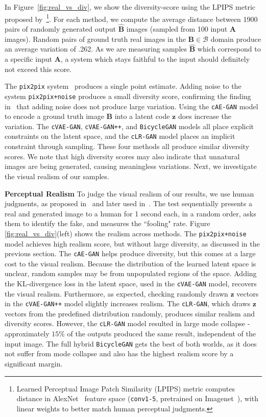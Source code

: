 In Figure~\ref{fig:real_vs_div}, we show the diversity-score using the LPIPS metric proposed by~\cite{zhang2018unreasonable}\footnote{Learned Perceptual Image Patch Similarity (LPIPS) metric computes distance in AlexNet~\cite{krizhevsky2014one} feature space (\texttt{conv1-5}, pretrained on Imagenet~\citep{russakovsky2015imagenet}), with linear weights to better match human perceptual judgments.}. For each method, we compute the average distance between 1900 pairs of randomly generated output $\widehat{\mathbf{B}}$ images (sampled from 100 input $\mathbf{A}$ images). Random pairs of ground truth real images in the $\mathbf{B} \in \mathcal{B}$ domain produce an average variation of .262. As we are measuring samples $\widehat{\mathbf{B}}$ which correspond to a specific input $\mathbf{A}$, a system which stays faithful to the input should definitely not exceed this score.

The \texttt{pix2pix} system~\citep{isola2016image} produces a single point estimate. Adding noise to the system \texttt{pix2pix+noise} produces a small diversity score, confirming the finding in~\citep{isola2016image} that adding noise does not produce large variation. Using the \texttt{cAE-GAN} model to encode a ground truth image $\mathbf{B}$ into a latent code $\mathbf{z}$ does increase the variation. The \texttt{cVAE-GAN}, \texttt{cVAE-GAN++}, and \texttt{BicycleGAN} models all place explicit constraints on the latent space, and the \texttt{cLR-GAN} model places an implicit constraint through sampling. These four methods all produce similar diversity scores. We note that high diversity scores may also indicate that unnatural images are being generated, causing meaningless variations. Next, we investigate the visual realism of our samples.

{\bf Perceptual Realism} To judge the visual realism of our results, we use human judgments, as proposed in~\citep{zhang2016colorful} and later used in~\citep{isola2016image,zhu2017unpaired}. The test sequentially presents a real and generated image to a human for 1 second each, in a random order, asks them to identify the fake, and measures the ``fooling" rate. Figure \ref{fig:real_vs_div}(left) shows the realism across methods. The \texttt{pix2pix+noise} model achieves high realism score, but without large diversity, as discussed in the previous section. The \texttt{cAE-GAN} helps produce diversity, but this comes at a large cost to the visual realism. Because the distribution of the learned latent space is unclear, random samples may be from unpopulated regions of the space. Adding the KL-divergence loss in the latent space, used in the \texttt{cVAE-GAN} model, recovers the visual realism. Furthermore, as expected, checking randomly drawn $\mathbf{z}$ vectors in the \texttt{cVAE-GAN++} model slightly increases realism. The \texttt{cLR-GAN}, which draws $\mathbf{z}$ vectors from the predefined distribution randomly, produces similar realism and diversity scores. However, the \texttt{cLR-GAN} model resulted in large mode collapse - approximately $15\%$ of the outputs produced the same result, independent of the input image. The full hybrid \texttt{BicycleGAN} gets the best of both worlds, as it does not suffer from mode collapse and also has the highest realism score by a significant margin.  

